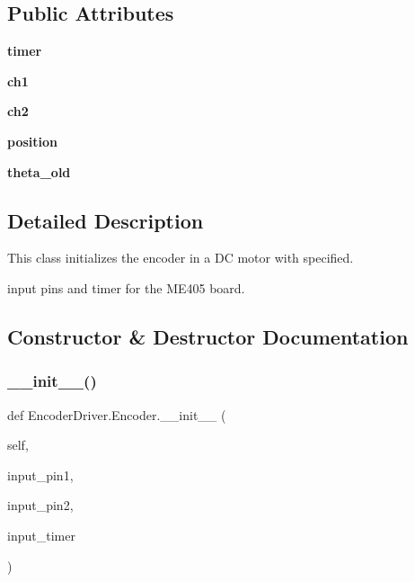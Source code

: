 \subsection*{Public Attributes}
\begin{DoxyCompactItemize}
\item 
\mbox{\label{classEncoderDriver_1_1Encoder_ade9e13ac188b468f151a2f266a63f396}} 
{\bfseries timer}
\item 
\mbox{\label{classEncoderDriver_1_1Encoder_a8c9e589d20e5815c98f2d0fa2921f0ee}} 
{\bfseries ch1}
\item 
\mbox{\label{classEncoderDriver_1_1Encoder_a5fddacdc4b22545c5dbdc5225699d538}} 
{\bfseries ch2}
\item 
\mbox{\label{classEncoderDriver_1_1Encoder_a9be581feeefcba826bf611922d2b6f4a}} 
{\bfseries position}
\item 
\mbox{\label{classEncoderDriver_1_1Encoder_aa685e1ab0c7d2650ab2bd19f0ed6c467}} 
{\bfseries theta\+\_\+old}
\end{DoxyCompactItemize}


\subsection{Detailed Description}
This class initializes the encoder in a DC motor with specified. 

input pins and timer for the M\+E405 board. 

\subsection{Constructor \& Destructor Documentation}
\mbox{\label{classEncoderDriver_1_1Encoder_a5699cf699993f343adc3ad1c9b507157}} 
\subsubsection{\texorpdfstring{\+\_\+\+\_\+init\+\_\+\+\_\+()}{\_\_init\_\_()}}
{\footnotesize\ttfamily def Encoder\+Driver.\+Encoder.\+\_\+\+\_\+init\+\_\+\+\_\+ (\begin{DoxyParamCaption}\item[{}]{self,  }\item[{}]{input\+\_\+pin1,  }\item[{}]{input\+\_\+pin2,  }\item[{}]{input\+\_\+timer }\end{DoxyParamCaption})}



